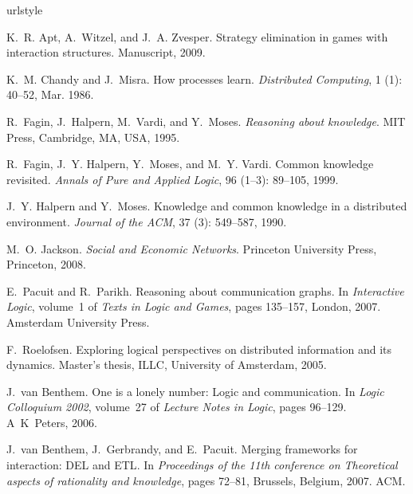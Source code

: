 \documentclass{article}
\newcounter{#1}
\begin{document}
\begin{thebibliography}{11}
\providecommand{\natexlab}[1]{#1}
\providecommand{\url}[1]{\texttt{#1}}
\expandafter\ifx\csname urlstyle\endcsname\relax
  \providecommand{\doi}[1]{doi: #1}\else
  \providecommand{\doi}{doi: \begingroup \urlstyle{rm}\Url}\fi

K.~R. Apt, A.~Witzel, and J.~A. Zvesper.
\newblock Strategy elimination in games with interaction structures.
\newblock Manuscript, 2009.

K.~M. Chandy and J.~Misra.
\newblock How processes learn.
\newblock \emph{Distributed Computing}, 1 (1): 40--52, Mar.
  1986.

R.~Fagin, J.~Halpern, M.~Vardi, and Y.~Moses.
\newblock \emph{Reasoning about knowledge}.
\newblock MIT Press, Cambridge, MA, USA, 1995.

R.~Fagin, J.~Y. Halpern, Y.~Moses, and M.~Y. Vardi.
\newblock Common knowledge revisited.
\newblock \emph{Annals of Pure and Applied Logic}, 96 (1--3):
  89--105, 1999.

J.~Y. Halpern and Y.~Moses.
\newblock Knowledge and common knowledge in a distributed environment.
\newblock \emph{Journal of the ACM}, 37 (3): 549--587, 1990.

M.~O. Jackson.
\newblock \emph{Social and Economic Networks}.
\newblock Princeton University Press, Princeton, 2008.

E.~Pacuit and R.~Parikh.
\newblock Reasoning about communication graphs.
\newblock In \emph{Interactive Logic}, volume~1 of \emph{Texts in Logic and Games}, pages
  135--157, London, 2007. Amsterdam University Press.

F.~Roelofsen.
\newblock Exploring logical perspectives on distributed information and its
  dynamics.
\newblock Master's thesis, ILLC, University of Amsterdam, 2005.

J.~van Benthem.
\newblock One is a lonely number: Logic and communication.
\newblock In \emph{Logic Colloquium 2002}, volume~27 of \emph{Lecture Notes in Logic}, pages 96--129.
  A~K~Peters, 2006.

J.~van Benthem, J.~Gerbrandy, and E.~Pacuit.
\newblock Merging frameworks for interaction: {DEL} and {ETL}.
\newblock In \emph{Proceedings of the 11th conference on
  Theoretical aspects of rationality and knowledge}, pages 72--81, Brussels,
  Belgium, 2007. {ACM}.

\end{thebibliography}
\end{document}
